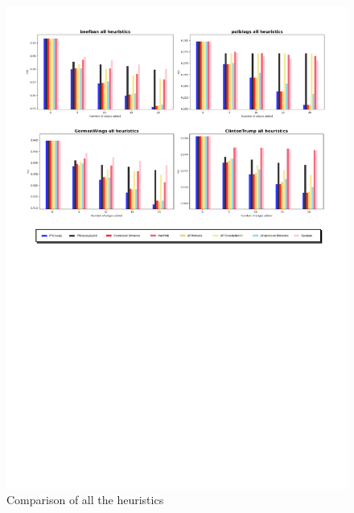 \begin{figure}[!htbp]
	\begin{center}
	\advance\leftskip-1.5cm
	\captionsetup{justification=centering,margin=2cm}
	\includegraphics[width=1.2\textwidth]{Figures/all2}
	\caption{Comparison of all the heuristics}
	\end{center}
	\label{all1}
\end{figure}

\clearpage


